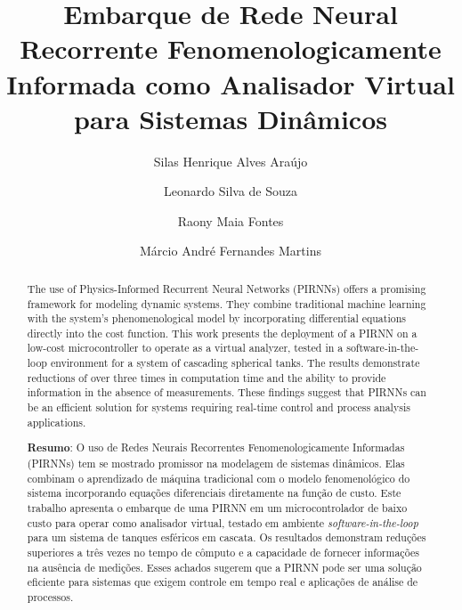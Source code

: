 \documentclass[a4paper]{ifacconf}
\begin{document}

\begin{frontmatter}
  \title{Embarque de Rede Neural Recorrente Fenomenologicamente Informada como Analisador Virtual para Sistemas Dinâmicos}

  \author[poliufba]{Silas Henrique Alves Araújo}
  \author[poliufba]{Leonardo Silva de Souza}
  \author[poliufba]{Raony Maia Fontes}
  \author[poliufba]{Márcio André Fernandes Martins}

  \address[poliufba]{Escola Politécnica, Universidade Federal da Bahia, BA, (e-mail: silasaraujo@ufba.br, lssouza@ufba.br, raony@ufba.br, marciomartins@ufba.br)}


  \renewcommand{\abstractname}{{\bf Abstract:~}}
  \begin{abstract}
    The use of Physics-Informed Recurrent Neural Networks (PIRNNs) offers a promising framework for modeling dynamic systems. They combine traditional machine learning with the system's phenomenological model by incorporating differential equations directly into the cost function.
    This work presents the deployment of a PIRNN on a low-cost microcontroller to operate as a virtual analyzer, tested in a software-in-the-loop environment for a system of cascading spherical tanks.
    The results demonstrate reductions of over three times in computation time and the ability to provide information in the absence of measurements. These findings suggest that PIRNNs can be an efficient solution for systems requiring real-time control and process analysis applications.

    \vskip 1mm
    {\noindent \bf Resumo}:  O uso de Redes Neurais Recorrentes Fenomenologicamente Informadas (PIRNNs) tem se mostrado promissor na modelagem de sistemas dinâmicos. Elas combinam o aprendizado de máquina tradicional com o modelo fenomenológico do sistema incorporando equações diferenciais diretamente na função de custo.
    Este trabalho apresenta o embarque de uma PIRNN em um microcontrolador de baixo custo para operar como analisador virtual, testado em ambiente \textit{software-in-the-loop} para um sistema de tanques esféricos em cascata.
    Os resultados demonstram reduções superiores a três vezes no tempo de cômputo e a capacidade de fornecer informações na ausência de medições. Esses achados sugerem que a PIRNN pode ser uma solução eficiente para sistemas que exigem controle em tempo real e aplicações de análise de processos.
  \end{abstract}


\end{frontmatter}
\end{document}
